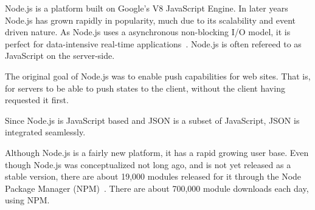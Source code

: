 Node.js is a platform built on Google's V8 JavaScript Engine. In later years Node.js has grown rapidly in popularity, much due to its scalability and event driven nature. As Node.js uses a asynchronous non-blocking I/O model, it is perfect for data-intensive real-time applications~\citep{site:nodejs}. Node.js is often refereed to as JavaScript on the server-side. 

The original goal of Node.js was to enable push capabilities for web sites. That is, for servers to be able to push states to the client, without the client having requested it first. 

Since Node.js is JavaScript based and JSON is a subset of JavaScript, JSON is integrated seamlessly. 

Although Node.js is a fairly new platform, it has a rapid growing user base. Even though Node.js was conceptualized not long ago, and is not yet released as a stable version, there are about 19,000 modules released for it through the Node Package Manager (NPM)~\citep{site:npm}. There are about 700,000 module downloads each day, using NPM. 